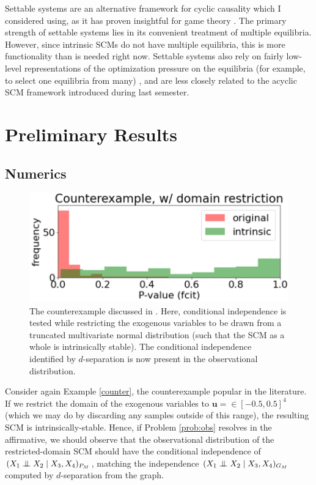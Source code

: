\documentclass[letterpaper,10pt]{article}
\newcommand{\CI}{\mathrel{\perp\mspace{-10mu}\perp}}
\begin{document}
Settable systems are an alternative framework for cyclic causality \cite{White&Chalak} which I considered using, as it has proven insightful for game theory \cite{GameIncomplete}. The primary strength of settable systems lies in its convenient treatment of multiple equilibria. However, since intrinsic SCMs do not have multiple equilibria, this is more functionality than is needed right now. Settable systems also rely on fairly low-level representations of the optimization pressure on the equilibria (for example, to select one equilibria from many) \cite{CausalGames}, and are less closely related to the acyclic SCM framework introduced during last semester.

\section{Preliminary Results}

\subsection{Numerics}

\begin{figure}
\centering
\includegraphics[width=.5\linewidth]{pics/my_own/counterexample_domain_restriction.png}
\caption{The counterexample discussed in \cite{Acyclification,Foundations}. Here, conditional independence is tested while restricting the exogenous variables to be drawn from a truncated multivariate normal distribution (such that the SCM as a whole is intrinsically stable). The conditional independence identified by $d$-separation is now present in the observational distribution.}
\label{fig:counterexample_domain_restriction}
\end{figure}

Consider again Example \ref{counter}, the counterexample popular in the literature. If we restrict the domain of the exogenous variables to $\mathbf{u}=\in [-0.5,0.5]^4$ (which we may do by discarding any samples outside of this range), the resulting SCM is intrinsically-stable. Hence, if Problem \ref{prob:obs} resolves in the affirmative, we should observe that the observational distribution of the restricted-domain SCM should have the conditional independence of $(X_1 \CI X_2 \mid X_3,X_4)_{P_M}$, matching the independence $(X_1 \CI X_2 \mid X_3,X_4)_{G_M}$ computed by $d$-separation from the graph.
\end{document}
